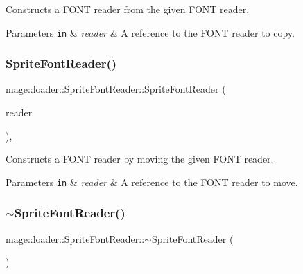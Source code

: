 Constructs a F\+O\+NT reader from the given F\+O\+NT reader.


\begin{DoxyParams}[1]{Parameters}
\mbox{\tt in}  & {\em reader} & A reference to the F\+O\+NT reader to copy. \\
\hline
\end{DoxyParams}
\hypertarget{classmage_1_1loader_1_1_sprite_font_reader_aaeca152199f1772be8c046ade184c6e8}{}\label{classmage_1_1loader_1_1_sprite_font_reader_aaeca152199f1772be8c046ade184c6e8} 
\subsubsection{\texorpdfstring{Sprite\+Font\+Reader()}{SpriteFontReader()}\hspace{0.1cm}{\footnotesize\ttfamily [3/3]}}
{\footnotesize\ttfamily mage\+::loader\+::\+Sprite\+Font\+Reader\+::\+Sprite\+Font\+Reader (\begin{DoxyParamCaption}\item[{\hyperlink{classmage_1_1loader_1_1_sprite_font_reader}{Sprite\+Font\+Reader} \&\&}]{reader }\end{DoxyParamCaption})\hspace{0.3cm}{\ttfamily [default]}, {\ttfamily [noexcept]}}

Constructs a F\+O\+NT reader by moving the given F\+O\+NT reader.


\begin{DoxyParams}[1]{Parameters}
\mbox{\tt in}  & {\em reader} & A reference to the F\+O\+NT reader to move. \\
\hline
\end{DoxyParams}
\hypertarget{classmage_1_1loader_1_1_sprite_font_reader_a6734ae8c3bfe35d7199815c3383647f3}{}\label{classmage_1_1loader_1_1_sprite_font_reader_a6734ae8c3bfe35d7199815c3383647f3} 
\subsubsection{\texorpdfstring{$\sim$\+Sprite\+Font\+Reader()}{~SpriteFontReader()}}
{\footnotesize\ttfamily mage\+::loader\+::\+Sprite\+Font\+Reader\+::$\sim$\+Sprite\+Font\+Reader (\begin{DoxyParamCaption}{ }\end{DoxyParamCaption})\hspace{0.3cm}{\ttfamily [default]}}

